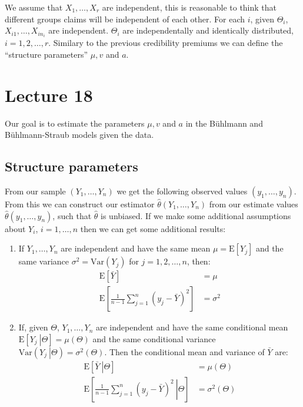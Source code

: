 \documentclass[english,12pt]{article}
\theoremstyle{plain}
\theoremstyle{definition}
\theoremstyle{definition} %
\newcommand{\enuma}[1]{\begin{enumerate}[label=(\alph{*})] #1 \end{enumerate}}
\newcommand{\ex}[1]{\mbox{E} \left[ #1 \right]}
\newcommand{\var}[1]{\mbox{Var} \left( #1 \right)}
\newcommand{\condex}[2]{\mbox{E} \left[ \left. #1 \ \right\vert \left. #2 \right. \right]}
\newcommand{\condvar}[2]{\mbox{Var} \left( \left. #1 \ \right\lvert \left. #2 \right. \right)}
\begin{document}
We assume that $X_1,\ldots, X_r$ are independent, this is reasonable to think that different groups claims will be independent of each other.  For each $i$, given $\Theta_i$, $X_{i1},\ldots, X_{in_i}$ are independent.  $\Theta_i$ are independentally and identically distributed, $i=1,2,\ldots,r$.  Similary to the previous credibility premiums we can define the ``structure parameters'' $\mu, v$ and $a$.

\section*{Lecture 18}
Our goal is to estimate the parameters $\mu, v$ and $a$ in the B\"{u}hlmann and B\"{u}hlmann-Straub models given the data.

\subsection{Structure parameters}
From our sample $(Y_1,\ldots,Y_n)$ we get the following observed values $(y_1,\ldots,y_n)$.  From this we can construct our estimator $\hat{\theta}(Y_1,\ldots,Y_n)$ from our estimate values $\hat{\theta}(y_1,\ldots,y_n)$, such that $\hat\theta$ is unbiased.  If we make some additional assumptions about $Y_i$, $i=1,\ldots,n$ then we can get some additional results:
\enuma{
\item If $Y_1,\ldots,Y_n$ are independent and have the same mean $\mu=\ex{Y_j}$ and the same variance $\sigma^2=\var{Y_j}$ for $j=1,2,\ldots,n$, then:
\begin{align*}
\ex{\bar{Y}}&=\mu\\
\ex{\frac{1}{n-1}\sum_{j=1}^n(y_j-\bar{Y})^2}&=\sigma^2
\end{align*}

\item If, given $\Theta$, $Y_1,\ldots,Y_n$ are independent and have the same conditional mean $\condex{Y_j}{\Theta}=\mu(\Theta)$ and the same conditional variance $\condvar{Y_j}{\Theta}=\sigma^2(\Theta)$.  Then the conditional mean and variance of $\bar{Y}$ are:
\begin{align*}
\condex{\bar{Y}}{\Theta}&=\mu(\Theta)\\
\condex{\frac{1}{n-1}\sum_{j=1}^n(y_j-\bar{Y})^2}{\Theta}&=\sigma^2(\Theta)
\end{align*}
}
\end{document}
